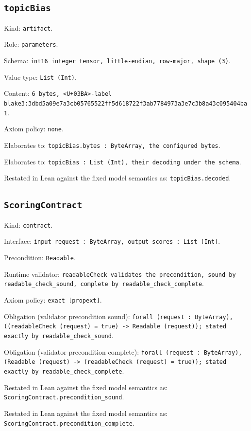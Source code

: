 \documentclass[11pt]{article}
\begin{document}
\subsection*{\texttt{topicBias}}
\noindent Kind: \texttt{artifact}.\par
\noindent Role: \texttt{parameters}.\par
\noindent Schema: \texttt{int16 integer tensor, little-endian, row-major, shape (3)}.\par
\noindent Value type: \texttt{List (Int)}.\par
\noindent Content: \texttt{6 bytes, <U+03BA>-label blake3:3dbd5a09e7a3cb05765522ff5d618722f3ab7784973a3e7c3b8a43c095404ba1}.\par
\noindent Axiom policy: \texttt{none}.\par
\noindent Elaborates to: \texttt{topicBias.bytes : ByteArray, the configured bytes}.\par
\noindent Elaborates to: \texttt{topicBias : List (Int), their decoding under the schema}.\par
\noindent Restated in Lean against the fixed model semantics as: \texttt{topicBias.decoded}.\par
\subsection*{\texttt{ScoringContract}}
\noindent Kind: \texttt{contract}.\par
\noindent Interface: \texttt{input request : ByteArray, output scores : List (Int)}.\par
\noindent Precondition: \texttt{Readable}.\par
\noindent Runtime validator: \texttt{readableCheck validates the precondition, sound by readable\_check\_sound, complete by readable\_check\_complete}.\par
\noindent Axiom policy: \texttt{exact [propext]}.\par
\noindent Obligation (validator precondition sound): \texttt{forall (request : ByteArray), ((readableCheck (request) = true) -> Readable (request)); stated exactly by readable\_check\_sound}.\par
\noindent Obligation (validator precondition complete): \texttt{forall (request : ByteArray), (Readable (request) -> (readableCheck (request) = true)); stated exactly by readable\_check\_complete}.\par
\noindent Restated in Lean against the fixed model semantics as: \texttt{ScoringContract.precondition\_sound}.\par
\noindent Restated in Lean against the fixed model semantics as: \texttt{ScoringContract.precondition\_complete}.\par
\end{document}
